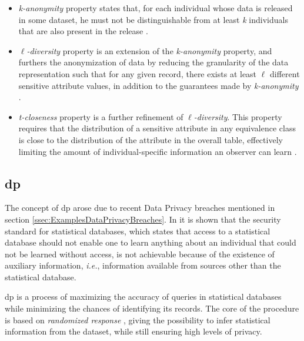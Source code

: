 \begin{itemize}
    \setlength\itemsep{1em}
    \item \textit{k-anonymity} property states that, for each individual whose data is released in some dataset, he must not be distinguishable from at least \textit{k} individuals that are also present in the release \cite{sweeney2002k}. 

    \item $\ell$\textit{-diversity} property is an extension of the \textit{k-anonymity} property, and furthers the anonymization of data by reducing the granularity of the data representation such that for any given record, there exists at least $\ell$ different sensitive attribute values, in addition to the guarantees made by \textit{k-anonymity} \cite{machanavajjhala2007diversity}.

    \item \textit{t-closeness} property is a further refinement of $\ell$\textit{-diversity}. This property requires that the distribution of a sensitive attribute in any equivalence class is close to the distribution of the attribute in the overall table, effectively limiting the amount of individual-specific information an observer can learn \cite{li2007t}.  
\end{itemize} 


\subsection{\acl{dp}}
\label{ssec:DifferentialPrivacy}


The concept of \acf{dp} arose due to recent Data Privacy breaches mentioned in section \ref{ssec:ExamplesDataPrivacyBreaches}. In \cite{Dwork2006} it is shown that the security standard for statistical databases, which states that access to a statistical database should not enable one to learn anything about an individual that could not be learned without access, is not achievable because of the existence of auxiliary information, \textit{i.e.}, information available from sources other than the statistical database.

\ac{dp} is a process of maximizing the accuracy of queries in statistical databases while minimizing the chances of identifying its records. The core of the procedure is based on \textit{randomized response} \cite{warner1965randomized}, giving the possibility to infer statistical information from the dataset, while still ensuring high levels of privacy.

